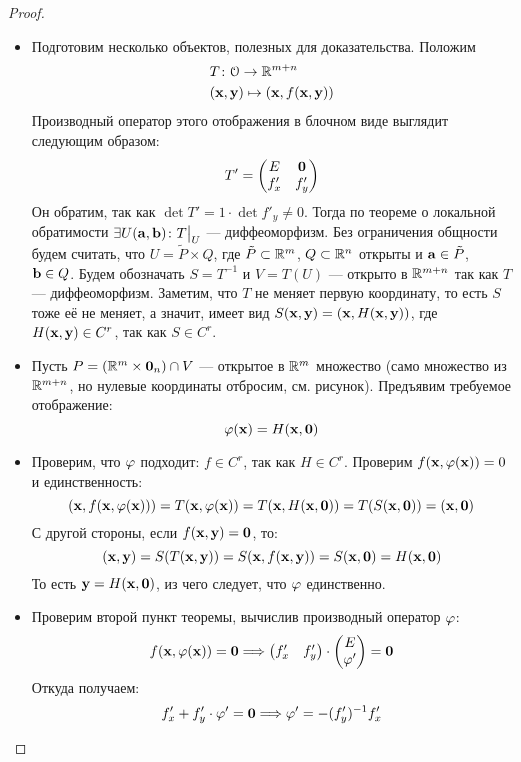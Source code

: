 \begin{proof}
    \enewline
    \begin{itemize}
        \item Подготовим несколько объектов, полезных для доказательства.
        Положим
\begin{align*}
    &T \colon \mathcal{O} \to \mathbb{R}^{m + n} \\
    &(\mathbf{x}, \mathbf{y}) \mapsto (\mathbf{x}, f(\mathbf{x}, \mathbf{y}))
\end{align*}
        Производный оператор этого отображения в блочном виде выглядит следующим
        образом:
\[
        T' = \begin{pmatrix}
                E & \mathbf{0} \\
                f'_x & f'_y
             \end{pmatrix}
\]
        Он обратим, так как $\det{T'} = 1 \cdot \det{f'_y} \neq 0$. Тогда по теореме о локальной
        обратимости $\exists U(\mathbf{a}, \mathbf{b})\colon T\big|_U$
        --- диффеоморфизм. Без ограничения общности будем считать, что
        $U = \tilde{P} \times Q$, где $\tilde{P} \subset \mathbb{R}^m$, $Q \subset \mathbb{R}^n$
        открыты и $\mathbf{a} \in \tilde{P}$, $\mathbf{b} \in Q$. Будем обозначать
        $S = T^{-1}$ и $V = T(U)$ --- открыто в $\mathbb{R}^{m + n}$ так как $T$ --- диффеоморфизм.
        Заметим, что $T$ не меняет первую координату, то есть $S$ тоже её не меняет,
        а значит, имеет вид $S(\mathbf{x}, \mathbf{y}) = (\mathbf{x}, H(\mathbf{x}, \mathbf{y}))$, где $H(\mathbf{x}, \mathbf{y}) \in C^r$,
        так как $S \in C^r$.

        \item Пусть $P = (\mathbb{R}^m \times \mathbf{0}_n) \cap V$ --- открытое в
        $\mathbb{R}^m$ множество (само множество из $\mathbb{R}^{m + n}$, но нулевые координаты
        отбросим, см. рисунок). Предъявим требуемое отображение:
\[
    \varphi(\mathbf{x}) = H(\mathbf{x}, \mathbf{0})
\]

        \item Проверим, что $\varphi$ подходит: $f \in C^r$, так как
        $H \in C^r$. Проверим $f(\mathbf{x}, \varphi(\mathbf{x})) = 0$ и единственность:
\[
    (\mathbf{x}, f(\mathbf{x}, \varphi(\mathbf{x}))) = T(\mathbf{x}, \varphi(\mathbf{x})) = T(\mathbf{x}, H(\mathbf{x}, \mathbf{0})) =
    T(S(\mathbf{x}, \mathbf{0})) = (\mathbf{x}, \mathbf{0})
\]
        С другой стороны, если $f(\mathbf{x}, \mathbf{y}) = \mathbf{0}$, то:
\[
    (\mathbf{x}, \mathbf{y}) = S(T(\mathbf{x}, \mathbf{y})) = S(\mathbf{x}, f(\mathbf{x}, \mathbf{y})) = S(\mathbf{x}, \mathbf{0}) = H(\mathbf{x}, \mathbf{0})
\]
        То есть $\mathbf{y} = H(\mathbf{x}, \mathbf{0})$, из чего следует, что $\varphi$ единственно.

        \item Проверим второй пункт теоремы, вычислив производный оператор $\varphi$:
\[
    f(\mathbf{x}, \varphi(\mathbf{x})) = \mathbf{0} \Longrightarrow \begin{pmatrix}
                                f'_x & f'_y
                           \end{pmatrix}
                           \cdot
                           \begin{pmatrix}
                               E \\
                               \varphi'
                           \end{pmatrix} = \mathbf{0}
\]
    Откуда получаем:
\[
    f'_x + f'_y \cdot \varphi' = \mathbf{0} \Longrightarrow \varphi' = -(f'_y)^{-1}f'_x
\]
    \end{itemize}
\end{proof}

